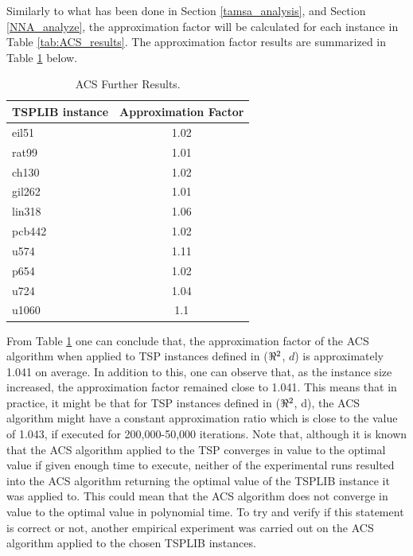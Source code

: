 \documentclass[12pt]{article}
\numberwithin{equation}{subsection}
\numberwithin{table}{subsection}
\numberwithin{algorithm}{subsection}
\numberwithin{figure}{subsection}
\begin{document}
Similarly to what has been done in Section \ref{tamsa_analysis}, and Section \ref{NNA_analyze}, the approximation factor will be calculated for each instance in Table \ref{tab:ACS_results}. The approximation factor results are summarized in Table \ref{tab:ACS_further} below.
\begin{table}[H]
\centering
    \caption{ACS Further Results.}
    \label{tab:ACS_further}
    \begin{tabular}{l|c} %
      \textbf{TSPLIB instance} & \textbf{Approximation Factor}\\
      \hline
    eil51 & 1.02\\
    rat99 & 1.01\\
    ch130 & 1.02\\
    gil262 & 1.01\\
    lin318 & 1.06\\
    pcb442 & 1.02\\
    u574 & 1.11\\ 
    p654 & 1.02\\
    u724 & 1.04\\
    u1060 & 1.1\\
    \end{tabular}
\end{table}
From Table \ref{tab:ACS_further} one can conclude that, the approximation factor of the ACS algorithm when applied to TSP instances defined in ($\real^2$, $d$) is approximately 1.041 on average. In addition to this, one can observe that, as the instance size increased, the approximation factor remained close to 1.041. This means that in practice, it might be that for TSP instances defined in ($\real^2$, d), the ACS algorithm might have a constant approximation ratio which is close to the value of 1.043, if executed for 200,000-50,000 iterations. Note that, although it is known that the ACS algorithm applied to the TSP converges in value to the optimal value if given enough time to execute, neither of the experimental runs resulted into the ACS algorithm returning the optimal value of the TSPLIB instance it was applied to. This could mean that the ACS algorithm does not converge in value to the optimal value in polynomial time. To try and verify if this statement is correct or not, another empirical experiment was carried out on the ACS algorithm applied to the chosen TSPLIB instances.\\\\
\end{document}
